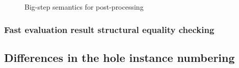 \begin{figure}
  \centering
  \begin{mdframed}
    \begin{singlespace}
      
    \end{singlespace}
  \end{mdframed}
  \caption{Big-step semantics for post-processing}
  \label{fig:big-step-postprocessing-rules}
\end{figure}

\subsubsection{Fast evaluation result structural equality checking}
\label{sec:fast-equals}

\subsection{Differences in the hole instance numbering}
\label{sec:differences_numbering}


